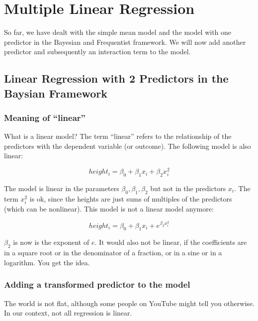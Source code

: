 \documentclass[
]{book}
\begin{document}
\chapter{Multiple Linear Regression}\label{multiple-linear-regression}

So far, we have dealt with the simple mean model and the model with one predictor
in the Bayesian and Frequentist framework.
We will now add another predictor and subsequently an interaction term to the model.

\section{Linear Regression with 2 Predictors in the Baysian Framework}\label{linear-regression-with-2-predictors-in-the-baysian-framework}

\subsection{Meaning of ``linear''}\label{meaning-of-linear}

What is a linear model? The term ``linear'' refers to the relationship of the predictors
with the dependent variable (or outcome). The following model is also linear:

\[height_i = \beta_0 + \beta_1 x_i + \beta_2 x_i^2\]

The model is linear in the parameters \(\beta_0, \beta_1, \beta_2\) but not in the predictors \(x_i\).
The term \(x_i^2\) is ok, since the heights are just sums of multiples of the predictors (which can be nonlinear).
This model is not a linear model anymore:

\[height_i = \beta_0 + \beta_1 x_i + e^{\beta_2 x_i^2}\]

\(\beta_2\) is now is the exponent of \(e\). It would also not be linear,
if the coefficients are in a square root or in the denominator of a fraction,
or in a sine or in a logarithm. You get the idea.

\subsection{Adding a transformed predictor to the model}\label{adding_transformed_predictor}

The world is not flat, although some people on YouTube might tell you otherwise.
In our context, not all regression is linear.
\end{document}
